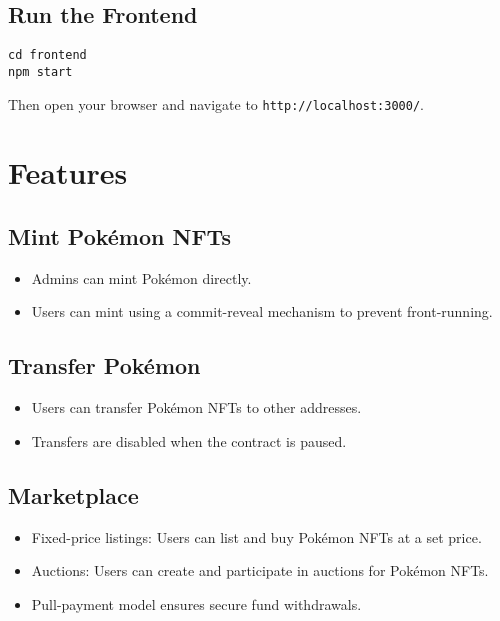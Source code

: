 \documentclass{article}
\begin{document}
\subsection{Run the Frontend}
\begin{lstlisting}
cd frontend
npm start
\end{lstlisting}

Then open your browser and navigate to \texttt{http://localhost:3000/}.

\section{Features}
\subsection{Mint Pokémon NFTs}
\begin{itemize}
    \item Admins can mint Pokémon directly.
    \item Users can mint using a commit-reveal mechanism to prevent front-running.
\end{itemize}

\subsection{Transfer Pokémon}
\begin{itemize}
    \item Users can transfer Pokémon NFTs to other addresses.
    \item Transfers are disabled when the contract is paused.
\end{itemize}

\subsection{Marketplace}
\begin{itemize}
    \item Fixed-price listings: Users can list and buy Pokémon NFTs at a set price.
    \item Auctions: Users can create and participate in auctions for Pokémon NFTs.
    \item Pull-payment model ensures secure fund withdrawals.
\end{itemize}
\end{document}
